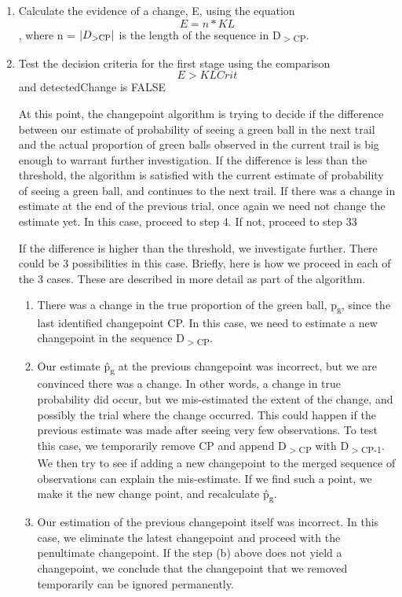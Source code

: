 \documentclass{article}
\begin{document}
\begin{enumerate}
\item Calculate the evidence of a change, E, using the equation
\[ E = n * KL \],
where n = $|D\textsubscript{$>$CP}|$ is the length of the sequence in  D\textsubscript{$>$CP}. 

\item Test the decision criteria for the first stage using the comparison
\[ E > KLCrit \] and detectedChange is FALSE

At this point, the changepoint algorithm is trying to decide if the difference between our estimate of probability of seeing a green ball in the next trail and the actual proportion of green balls observed in the current trail is big enough to warrant further investigation. If the difference is less than the threshold, the algorithm is satisfied with the current estimate of probability of seeing a green ball, and continues to the next trail. If there was a change in estimate at the end of the previous trial, once again we need not change the estimate yet. In this case, proceed to step 4. If not, proceed to step 33 \par

If the difference is higher than the threshold, we investigate further. There could be 3 possibilities in this case. Briefly, here is how we proceed in each of the 3 cases. These are described in more detail as part of the algorithm.
	\begin{enumerate}
	\item There was a change in the true proportion of the green ball, p\textsubscript{g}, since the last identified changepoint CP. In this case, we need to estimate a new changepoint in the sequence D\textsubscript{$>$CP}.
	\item Our estimate \^{p\textsubscript{g}} at the previous changepoint was incorrect, but we are convinced there was a change. In other words, a change in true probability did occur, but we mis-estimated the extent of the change, and possibly the trial where the change occurred. This could happen if the previous estimate was made after seeing very few observations. To test this case, we temporarily remove CP and append D\textsubscript{$>$CP} with D\textsubscript{$>$CP-1}. We then try to see if adding a new changepoint to the merged sequence of observations can explain the mis-estimate. If we find such a point, we make it the new change point, and recalculate \^{p\textsubscript{g}}. 
	\item Our estimation of the previous changepoint itself was incorrect. In this case, we eliminate the latest changepoint and proceed with the penultimate changepoint. If the step (b) above does not yield a changepoint, we conclude that the changepoint that we removed temporarily can be ignored permanently.
	\end{enumerate}


\end{enumerate}
\end{document}
